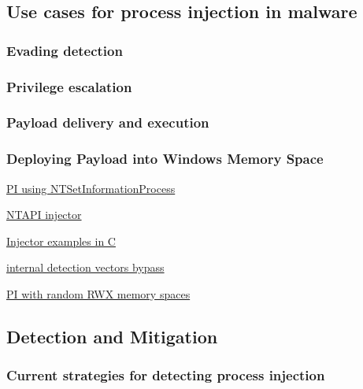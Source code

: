 \subsection{Use cases for process injection in malware}

\subsubsection{Evading detection}

\subsubsection{Privilege escalation}

\subsubsection{Payload delivery and execution}

\subsubsection{Deploying Payload into Windows Memory Space}


\autocite{Zhan:2018}

\href{https://www.riskinsight-wavestone.com/en/2023/10/process-injection-using-ntsetinformationprocess/}{PI using NTSetInformationProcess}

\href{https://github.com/elddy/Windows-NTAPI-Injector}{NTAPI injector} 

\href{https://gist.github.com/WKL-Sec/96e17188e4c159c2cdf7ff2c111130cc#file-local-c}{Injector examples in C}

\href{https://www.unknowncheats.me/forum/anti-cheat-bypass/286274-internal-detection-vectors-bypass.html}{internal detection vectors bypass}

\href{https://medium.com/@s12deff/process-injection-with-random-rwx-memory-spaces-3e3651149527}{PI with random RWX memory spaces}


\subsection{Detection and Mitigation}

\subsubsection{Current strategies for detecting process injection}

